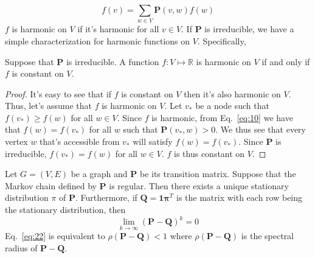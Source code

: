 \begin{equation}
  \label{eq:10}
  f(v) = \sum_{w \in V}{\mathbf{P}(v,w) f(w)}
\end{equation}
$f$ is harmonic on $V$ if it's harmonic for all $v \in V$. If $\mathbf{P}$
is irreducible, we have a simple characterization for harmonic
functions on $V$. Specifically,
\begin{lemma}
  \label{lem:1}
  Suppose that $\mathbf{P}$ is irreducible. A function $f \colon V \mapsto
  \mathbb{R}$ is harmonic on $V$ if and only if $f$ is constant on
  $V$. 
\end{lemma}
\begin{proof}
  It's easy to see that if $f$ is constant on $V$ then it's also
  harmonic on $V$. Thus, let's assume that $f$ is harmonic on $V$.
  Let $v_*$ be a node such that $f(v_*) \geq f(w)$ for all $w \in
  V$. Since $f$ is harmonic, from Eq.~\eqref{eq:10} we have that $f(w)
  = f(v_*)$ for all $w$ such that $\mathbf{P}(v_*,w) > 0$. We thus see
  that every vertex $w$ that's accessible from $v_*$ will satisfy
  $f(w) = f(v_*)$. Since $\mathbf{P}$ is irreducible, $f(v_*) = f(w)$ for
  all $w \in V$. $f$ is thus constant on $V$.
\end{proof}

\begin{proposition}
  \label{prop:6}
  Let $G = (V,E)$ be a graph and $\mathbf{P}$ be its transition
  matrix. Suppose that the Markov chain defined by $\mathbf{P}$ is
  regular. Then there exists a unique stationary distribution $\pi$ of
  $\mathbf{P}$. Furthermore, if $\mathbf{Q} = \mathbf{1} \mathbf{\pi}^{T}$ is the
  matrix with each row being the stationary distribution, then
  \begin{equation}
    \label{eq:22}
    \lim_{k \rightarrow \infty}(\mathbf{P} - \mathbf{Q})^{k} = 0 
  \end{equation}
  Eq.~\eqref{eq:22} is equivalent to $\rho(\mathbf{P}-\mathbf{Q}) < 1$
  where $\rho(\mathbf{P}-\mathbf{Q})$ is the spectral radius of
  $\mathbf{P} - \mathbf{Q}$.
\end{proposition}

